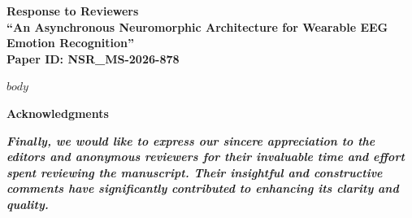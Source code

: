 \documentclass[12pt,technote,onecolumn]{IEEEtran}
\begin{document}
\begin{center}
{\large\bfseries Response to Reviewers}\\
{\bfseries ``An Asynchronous Neuromorphic Architecture for Wearable EEG Emotion Recognition''}\\
{\bfseries Paper ID: NSR\_MS-2026-878}\\
\end{center}

\vspace{4mm}
$body$

\vspace{10mm}
\begin{center}
{\large\textbf{Acknowledgments}}\\[3mm]
\begin{minipage}{0.9\textwidth}
\textit{\textbf{Finally, we would like to express our sincere appreciation to the editors and anonymous reviewers for their invaluable time and effort spent reviewing the manuscript. Their insightful and constructive comments have significantly contributed to enhancing its clarity and quality.}}
\end{minipage}
\end{center}
\end{document}
